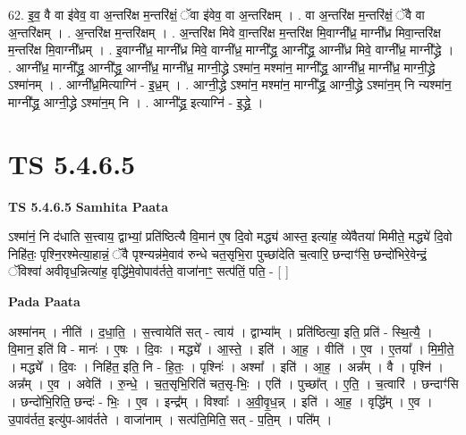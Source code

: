 \documentclass[17pt]{extarticle}
\begin{document}
62. इ॒व॒ वै वा इ॑वेव॒ वा अ॒न्तरि॑क्ष म॒न्तरि॑क्षं॒ ॅवा इ॑वेव॒ वा अ॒न्तरि॑क्षम् । . वा अ॒न्तरि॑क्ष म॒न्तरि॑क्षं॒ ॅवै वा अ॒न्तरि॑क्षम् । . अ॒न्तरि॑क्ष म॒न्तरि॑क्षम् । . अ॒न्तरि॑क्ष मिवे वा॒न्तरि॑क्ष म॒न्तरि॑क्ष मि॒वाग्नी᳚ध्र॒ माग्नी᳚ध्र मिवा॒न्तरि॑क्ष म॒न्तरि॑क्ष मि॒वाग्नी᳚ध्रम् । . इ॒वाग्नी᳚ध्र॒ माग्नी᳚ध्र मिवे॒ वाग्नी᳚ध्र॒ माग्नी᳚द्ध्र॒ आग्नी᳚द्ध्र॒ आग्नी᳚ध्र मिवे॒ वाग्नी᳚ध्र॒ माग्नी᳚द्ध्रे । . आग्नी᳚ध्र॒ माग्नी᳚द्ध्र॒ आग्नी᳚द्ध्र॒ आग्नी᳚ध्र॒ माग्नी᳚ध्र॒ माग्नी॒द्ध्रे ऽश्मा॑न॒ मश्मा॑न॒ माग्नी᳚द्ध्र॒ आग्नी᳚ध्र॒ माग्नी᳚ध्र॒ माग्नी॒द्ध्रे ऽश्मा॑नम् । . आग्नी᳚ध्र॒मित्याग्नि॑ - इ॒ध्र॒म् । . आग्नी॒द्ध्रे ऽश्मा॑न॒ मश्मा॑न॒ माग्नी᳚द्ध्र॒ आग्नी॒द्ध्रे ऽश्मा॑न॒म् नि न्यश्मा॑न॒ माग्नी᳚द्ध्र॒ आग्नी॒द्ध्रे ऽश्मा॑न॒म् नि । . आग्नी᳚द्ध्र॒ इत्याग्नि॑ - इ॒द्ध्रे॒ । \newline
\pagebreak
{}

\section{ TS 5.4.6.5 }

\textbf{TS 5.4.6.5 } \newline
\textbf{Samhita Paata} \newline

ऽश्मा॑नं॒ नि द॑धाति स॒त्त्वाय॒ द्वाभ्यां॒ प्रति॑ष्ठित्यै वि॒मान॑ ए॒ष दि॒वो मद्ध्य॑ आस्त॒ इत्या॑ह॒ व्ये॑वैतया॑ मिमीते॒ मद्ध्ये॑ दि॒वो निहि॑तः॒ पृश्नि॒रश्मेत्या॒हान्नं॒ ॅवै पृश्न्यन्न॑मे॒वाव॑ रुन्धे चत॒सृभि॒रा पुच्छा॑देति च॒त्वारि॒ छन्दाꣳ॑सि॒ छन्दो॑भिरे॒वेन्द्रं॒ ॅविश्वा॑ अवीवृध॒न्नित्या॑ह॒ वृद्धि॑मे॒वोपाव॑र्तते॒ वाजा॑नाꣳ॒॒ सत्प॑तिं॒ पति॒ - [  ] \newline

\textbf{Pada Paata} \newline

अश्मा॑नम् । नीति॑ । द॒धा॒ति॒ । स॒त्त्वायेति॑ सत् - त्वाय॑ । द्वाभ्या᳚म् । प्रति॑ष्ठित्या॒ इति॒ प्रति॑ - स्थि॒त्यै॒ । वि॒मान॒ इति॑ वि - मानः॑ । ए॒षः । दि॒वः । मद्ध्ये᳚ । आ॒स्ते॒ । इति॑ । आ॒ह॒ । वीति॑ । ए॒व । ए॒तया᳚ । मि॒मी॒ते॒ । मद्ध्ये᳚ । दि॒वः । निहि॑त॒ इति॒ नि - हि॒तः॒ । पृश्निः॑ । अश्मा᳚ । इति॑ । आ॒ह॒ । अन्न᳚म् । वै । पृश्नि॑ । अन्न᳚म् । ए॒व । अवेति॑ । रु॒न्धे॒ । च॒त॒सृभि॒रिति॑ चत॒सृ-भिः॒ । एति॑ । पुच्छा᳚त् । ए॒ति॒ । च॒त्वारि॑ । छन्दाꣳ॑सि । छन्दो॑भि॒रिति॒ छन्दः॑ - भिः॒ । ए॒व । इन्द्र᳚म् । विश्वाः᳚ । अ॒वी॒वृ॒ध॒न्न् । इति॑ । आ॒ह॒ । वृद्धि᳚म् । ए॒व । उ॒पाव॑र्तत॒ इत्यु॑प-आव॑र्तते । वाजा॑नाम् । सत्प॑ति॒मिति॒ सत् - प॒ति॒म् । पति᳚म् ।  \newline
\end{document}
